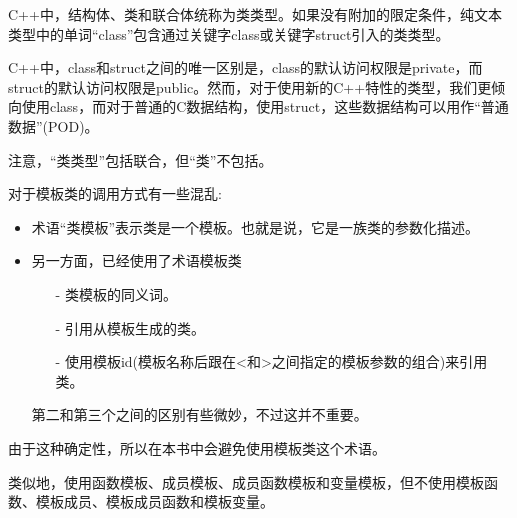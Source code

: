 C++中，结构体、类和联合体统称为类类型。如果没有附加的限定条件，纯文本类型中的单词“class”包含通过关键字class或关键字struct引入的类类型。

\begin{notice}C++中，class和struct之间的唯一区别是，class的默认访问权限是private，而struct的默认访问权限是public。然而，对于使用新的C++特性的类型，我们更倾向使用class，而对于普通的C数据结构，使用struct，这些数据结构可以用作“普通数据”(POD)。
\end{notice}

注意，“类类型”包括联合，但“类”不包括。

对于模板类的调用方式有一些混乱:

\begin{itemize}
\item 
术语“类模板”表示类是一个模板。也就是说，它是一族类的参数化描述。

\item 
另一方面，已经使用了术语模板类
\begin{itemize}
\item[-]
类模板的同义词。

\item[-]
引用从模板生成的类。

\item[-]
使用模板id(模板名称后跟在<和>之间指定的模板参数的组合)来引用类。
\end{itemize}

第二和第三个之间的区别有些微妙，不过这并不重要。
\end{itemize}

由于这种确定性，所以在本书中会避免使用模板类这个术语。

类似地，使用函数模板、成员模板、成员函数模板和变量模板，但不使用模板函数、模板成员、模板成员函数和模板变量。

















